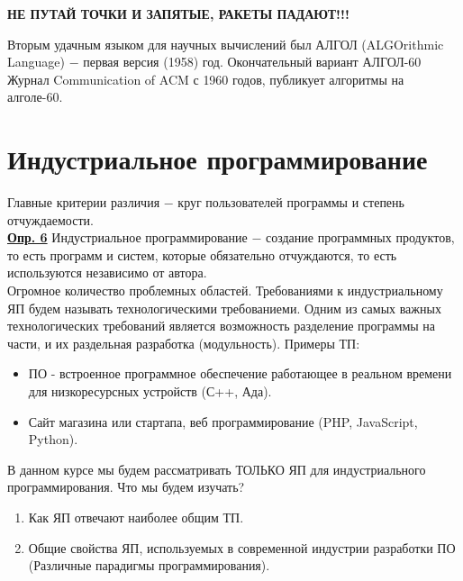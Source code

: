\documentclass[a4paper, 12pt, titlepage, finall]{extreport}
\begin{document}
            {\bf НЕ ПУТАЙ ТОЧКИ И ЗАПЯТЫЕ, РАКЕТЫ ПАДАЮТ!!!}
            
            Вторым удачным языком для научных вычислений был АЛГОЛ (ALGOrithmic Language) $-$ первая версия (1958) год.
            Окончательный вариант АЛГОЛ-60
            Журнал Communication of ACM с 1960 годов, публикует алгоритмы на алголе-60.
        \section{Индустриальное программирование}
            Главные критерии различия $-$ круг пользователей программы и степень отчуждаемости.\\
            \underline{\bf Опр. 6} Индустриальное программирование $-$ создание программных продуктов, то есть программ и систем, 
            которые обязательно отчуждаются, то есть используются независимо от автора.\\
            Огромное количество проблемных областей.
            Требованиями к индустриальному ЯП будем называть технологическими требованиеми.
            Одним из самых важных технологических требований является возможность разделение программы на части, и их раздельная разработка (модульность).
            Примеры ТП:
            \begin{itemize}
                \item ПО - встроенное программное обеспечение работающее в реальном времени для низкоресурсных устройств (С++, Ада).
                \item Сайт магазина или стартапа, веб программирование (PHP, JavaScript, Python).
            \end{itemize}
            В данном курсе мы будем рассматривать ТОЛЬКО ЯП для индустриального программирования.
            Что мы будем изучать?
            \begin{enumerate}
                \item Как ЯП отвечают наиболее общим ТП.
                \item Общие свойства ЯП, используемых в современной индустрии разработки ПО (Различные парадигмы программирования).
            \end{enumerate}
            
\end{document}

